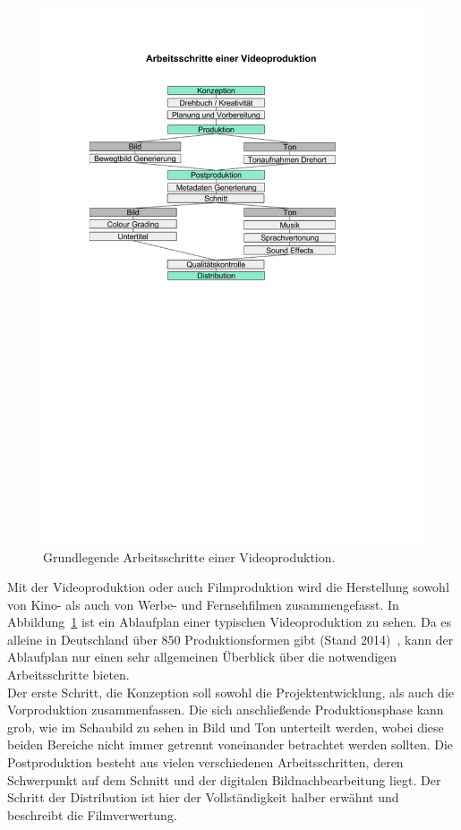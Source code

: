 \documentclass[times, 11pt,twocolumn]{article}
\begin{document}
 \label{sec:Videoproduktion}
\begin{figure}
	\flushleft
	\includegraphics[width=\columnwidth, trim = 20mm 145mm 45mm 40mm, clip]{Bilder/ArbeitsschritteVideoproduktion.pdf}
	\caption{Grundlegende Arbeitsschritte einer Videoproduktion.}
	\label{fig:Videoproduktion}
\end{figure}
Mit der Videoproduktion oder auch Filmproduktion wird die Herstellung sowohl von Kino- als auch von Werbe- und Fernsehfilmen zusammengefasst. In Abbildung~\ref{fig:Videoproduktion} ist ein Ablaufplan einer typischen Videoproduktion zu sehen. Da es alleine in Deutschland über 850 Produktionsformen gibt (Stand 2014)~\cite{formatt}, kann der Ablaufplan nur einen sehr allgemeinen Überblick über die notwendigen Arbeitsschritte bieten. \\
Der erste Schritt, die Konzeption soll sowohl die Projektentwicklung, als auch die Vorproduktion zusammenfassen. Die sich anschließende Produktionsphase kann grob, wie im Schaubild zu sehen in Bild und Ton unterteilt werden, wobei diese beiden Bereiche nicht immer getrennt voneinander betrachtet werden sollten. Die Postproduktion besteht aus vielen verschiedenen Arbeitsschritten, deren Schwerpunkt auf dem Schnitt und der digitalen Bildnachbearbeitung liegt. Der Schritt der Distribution ist hier der Vollständigkeit halber erwähnt und beschreibt die Filmverwertung. \\
\end{document}

